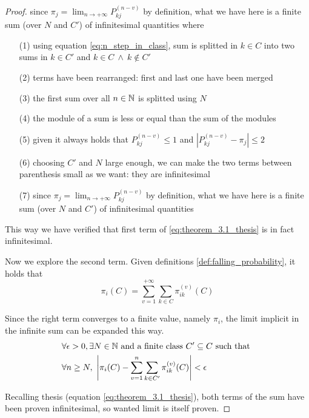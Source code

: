 \begin{proof}
		\setlength{\mathindent}{0cm} %

		since $\pi_j = \lim_{n \to +\infty} P_{kj}^{(n-v)}$ by definition, what we have here is a finite sum (over $N$ and $C'$) of infinitesimal quantities
		where
		\begin{itemize}
			\item [(1)] using equation \ref{eq:n_step_in_class}, sum is splitted in $k \in C$ into two sums in $k \in C'$ and $k \in C ~ \wedge ~ k \notin C' $
			\item [(2)] terms have been rearranged: first and last one have been merged
			\item [(3)] the first sum over all $n \in \mathbb{N}$ is splitted using $N$
			\item [(4)] the module of a sum is less or equal than the sum of the modules
			\item [(5)] given it always holds that $P_{kj}^{(n-v)} \le 1$ and $|P_{kj}^{(n-v)} - \pi_j| \le 2$
			\item [(6)] choosing $C'$ and $N$ large enough, we can make the two terms between parenthesis small as we want: they are infinitesimal
			\item [(7)] since $\pi_j = \lim_{n \to +\infty} P_{kj}^{(n-v)}$ by definition, what we have here is a finite sum (over $N$ and $C'$) of infinitesimal quantities
		\end{itemize}
		This way we have verified that first term of \ref{eq:theorem_3.1_thesis} is in fact infinitesimal.

		\bigbreak
		Now we explore the second term.
		Given definitions \ref{def:falling_probability}, it holds that
		$$ \pi_i(C) = \sum_{v = 1}^{+\infty} \sum_{k \in C} \pi_{ik}^{(v)}(C) $$

		\smallbreak
		Since the right term converges to a finite value, namely $\pi_i$, the limit implicit in the infinite sum can be expanded this way.
		\begin{equation}\begin{split} \label{eq:pi_limit_definition}
			& \forall \epsilon > 0, \exists N \in \mathbb{N} \text{ and a finite class } C' \subseteq C \text{ such that } \\
			& \forall n \ge N,~ \left| \pi_i(C) - \sum_{v = 1}^{n} \sum_{k \in C'} \pi_{ik}^{(v)}(C) \right| < \epsilon
		\end{split}\end{equation}

		\bigbreak
		Recalling thesis (equation \ref{eq:theorem_3.1_thesis}), both terms of the sum have been proven infinitesimal, so wanted limit is itself proven.
	\end{proof}

